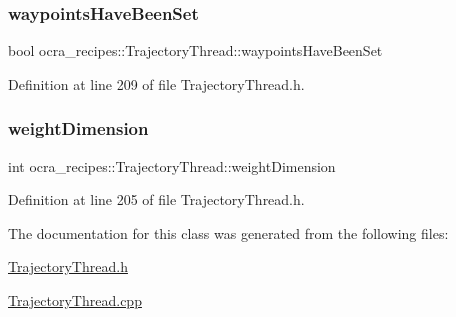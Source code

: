 \hypertarget{classocra__recipes_1_1TrajectoryThread_a35b51009ac64e577770b0e728846c4c4}{}\label{classocra__recipes_1_1TrajectoryThread_a35b51009ac64e577770b0e728846c4c4} 
\subsubsection{\texorpdfstring{waypoints\+Have\+Been\+Set}{waypointsHaveBeenSet}}
{\footnotesize\ttfamily bool ocra\+\_\+recipes\+::\+Trajectory\+Thread\+::waypoints\+Have\+Been\+Set\hspace{0.3cm}{\ttfamily [protected]}}



Definition at line 209 of file Trajectory\+Thread.\+h.

\hypertarget{classocra__recipes_1_1TrajectoryThread_a32ee7b3f9364768200a460283f7be5ef}{}\label{classocra__recipes_1_1TrajectoryThread_a32ee7b3f9364768200a460283f7be5ef} 
\subsubsection{\texorpdfstring{weight\+Dimension}{weightDimension}}
{\footnotesize\ttfamily int ocra\+\_\+recipes\+::\+Trajectory\+Thread\+::weight\+Dimension\hspace{0.3cm}{\ttfamily [protected]}}



Definition at line 205 of file Trajectory\+Thread.\+h.



The documentation for this class was generated from the following files\+:\begin{DoxyCompactItemize}
\item 
\hyperlink{TrajectoryThread_8h}{Trajectory\+Thread.\+h}\item 
\hyperlink{TrajectoryThread_8cpp}{Trajectory\+Thread.\+cpp}\end{DoxyCompactItemize}
